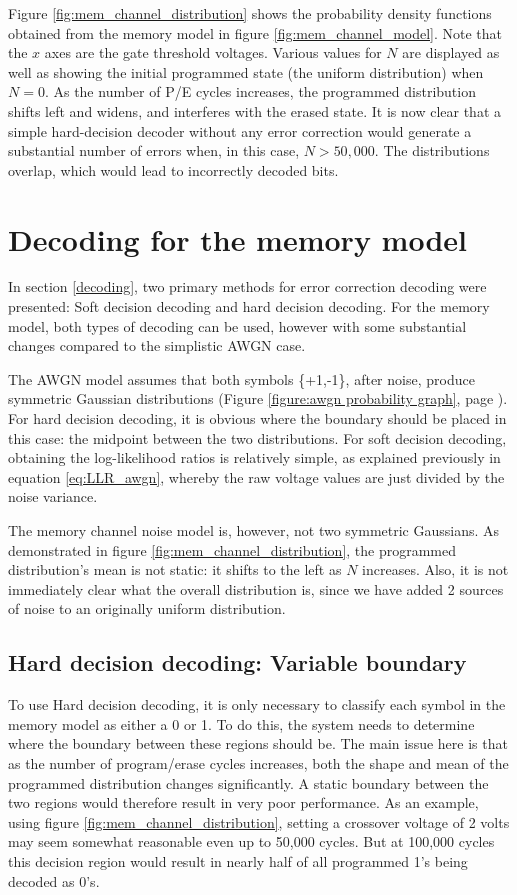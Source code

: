 \documentclass[11pt]{article}
\numberwithin{equation}{subsection}
\begin{document}
Figure \ref{fig:mem_channel_distribution} shows the probability density functions obtained from the memory model in figure \ref{fig:mem_channel_model}. Note that the $x$ axes are the gate threshold voltages. Various values for $N$ are displayed as well as showing the initial programmed state (the uniform distribution) when $N=0$. As the number of P/E cycles increases, the programmed distribution shifts left and widens, and interferes with the erased state. It is now clear that a simple hard-decision decoder without any error correction would generate a substantial number of errors when, in this case, $N > 50,000$. The distributions overlap, which would lead to incorrectly decoded bits.

\section{Decoding for the memory model}

In section \ref{decoding}, two primary methods for error correction decoding were presented: Soft decision decoding and hard decision decoding. For the memory model, both types of decoding can be used, however with some substantial changes compared to the simplistic AWGN case.

The AWGN model assumes that both symbols \{+1,-1\}, after noise, produce symmetric Gaussian distributions (Figure \ref{figure:awgn probability graph}, page \pageref{figure:awgn probability graph}). For hard decision decoding, it is obvious where the boundary should be placed in this case: the midpoint between the two distributions. For soft decision decoding, obtaining the log-likelihood ratios is relatively simple, as explained previously in equation \ref{eq:LLR_awgn}, whereby the raw voltage values are just divided by the noise variance. 

The memory channel noise model is, however, not two symmetric Gaussians. As demonstrated in figure \ref{fig:mem_channel_distribution}, the programmed distribution's mean is not static: it shifts to the left as $N$ increases. Also, it is not immediately clear what the overall distribution is, since we have added 2 sources of noise to an originally uniform distribution.

\subsection{Hard decision decoding: Variable boundary}

To use Hard decision decoding, it is only necessary to classify each symbol in the memory model as either a 0 or 1. To do this, the system needs to determine where the boundary between these regions should be. The main issue here is that as the number of program/erase cycles increases, both the shape and mean of the programmed distribution changes significantly. A static boundary between the two regions would therefore result in very poor performance. As an example, using figure \ref{fig:mem_channel_distribution}, setting a crossover voltage of 2 volts may seem somewhat reasonable even up to 50,000 cycles. But at 100,000 cycles this decision region would result in nearly half of all programmed 1's being decoded as 0's.
\end{document}
